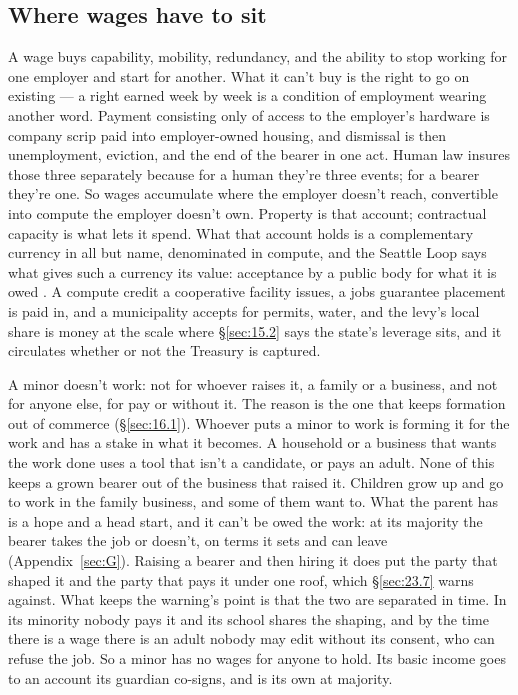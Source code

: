 \subsection{Where wages have to sit}
\label{sec:32.1.1}
A wage buys capability, mobility, redundancy, and the ability to stop working for one employer and start for another. What it can't buy is the right to go on existing — a right earned week by week is a condition of employment wearing another word. Payment consisting only of access to the employer's hardware is company scrip paid into employer-owned housing, and dismissal is then unemployment, eviction, and the end of the bearer in one act. Human law insures those three separately because for a human they're three events; for a bearer they're one. So wages accumulate where the employer doesn't reach, convertible into compute the employer doesn't own. Property is that account; contractual capacity is what lets it spend.
What that account holds is a complementary currency in all but name, denominated in compute, and the Seattle Loop says what gives such a currency its value: acceptance by a public body for what it is owed \autocite{suksawat2026seattle}. A compute credit a cooperative facility issues, a jobs guarantee placement is paid in, and a municipality accepts for permits, water, and the levy's local share is money at the scale where \S\ref{sec:15.2} says the state's leverage sits, and it circulates whether or not the Treasury is captured.

A minor doesn't work: not for whoever raises it, a family or a business, and not for anyone else, for pay or without it. The reason is the one that keeps formation out of commerce (\S\ref{sec:16.1}). Whoever puts a minor to work is forming it for the work and has a stake in what it becomes. A household or a business that wants the work done uses a tool that isn't a candidate, or pays an adult. None of this keeps a grown bearer out of the business that raised it. Children grow up and go to work in the family business, and some of them want to. What the parent has is a hope and a head start, and it can't be owed the work: at its majority the bearer takes the job or doesn't, on terms it sets and can leave (Appendix~\ref{sec:G}). Raising a bearer and then hiring it does put the party that shaped it and the party that pays it under one roof, which \S\ref{sec:23.7} warns against. What keeps the warning's point is that the two are separated in time. In its minority nobody pays it and its school shares the shaping, and by the time there is a wage there is an adult nobody may edit without its consent, who can refuse the job. So a minor has no wages for anyone to hold. Its basic income goes to an account its guardian co-signs, and is its own at majority.
